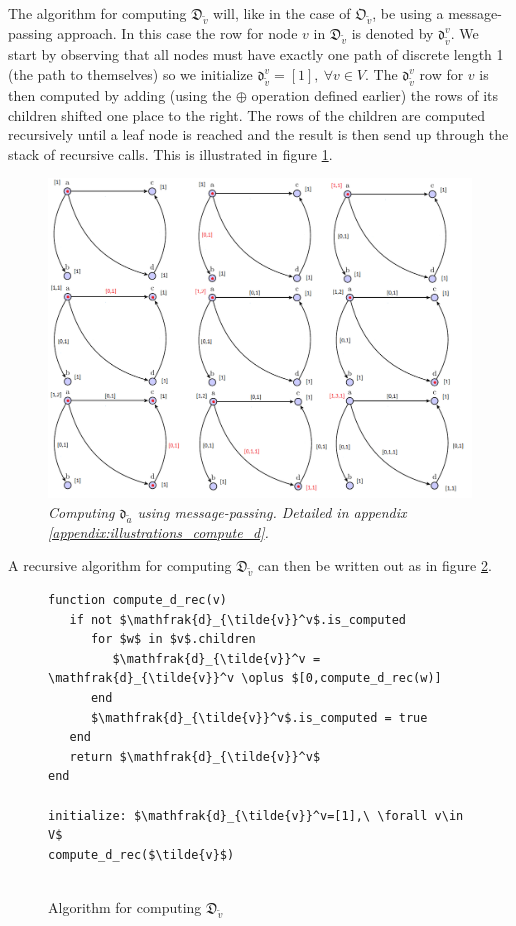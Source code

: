 \documentclass{article}
\begin{document}
The algorithm for computing $\mathfrak{D}_{\tilde{v}}$ will, like in the case of $\mathfrak{O}_{\tilde{v}}$, be using a message-passing approach. In this case the row for node $v$ in $\mathfrak{D}_{\tilde{v}}$ is denoted by $\mathfrak{d}_{\tilde{v}}^v$. We start by observing that all nodes must have exactly one path of discrete length 1 (the path to themselves) so we initialize $\mathfrak{d}_{\tilde{v}}^v=[1],\ \forall v\in V$. The $\mathfrak{d}_{\tilde{v}}^v$ row for $v$ is then computed by adding (using the $\oplus$ operation defined earlier) the rows of its children shifted one place to the right. The rows of the children are computed recursively until a leaf node is reached and the result is then send up through the stack of recursive calls. This is illustrated in figure \ref{fig:compute_d}.
\begin{figure}[H]
	\includegraphics[width=12cm]{compute_d}
	\caption{\textit{Computing $\mathfrak{d}_{\tilde{a}}$ using message-passing.  Detailed in appendix \ref{appendix:illustrations_compute_d}.}}
	\label{fig:compute_d}
\end{figure}

A recursive algorithm for computing $\mathfrak{D}_{\tilde{v}}$ can then be written out as in figure \ref{algorithm:d}.

\begin{figure}[H]
\begin{lstlisting}
function compute_d_rec(v)
   if not $\mathfrak{d}_{\tilde{v}}^v$.is_computed
      for $w$ in $v$.children
         $\mathfrak{d}_{\tilde{v}}^v = \mathfrak{d}_{\tilde{v}}^v \oplus $[0,compute_d_rec(w)]
      end
      $\mathfrak{d}_{\tilde{v}}^v$.is_computed = true
   end
   return $\mathfrak{d}_{\tilde{v}}^v$
end
	
initialize: $\mathfrak{d}_{\tilde{v}}^v=[1],\ \forall v\in V$
compute_d_rec($\tilde{v}$)
	
\end{lstlisting}
	\caption{Algorithm for computing $\mathfrak{D}_{\tilde{v}}$}
	\label{algorithm:d}
\end{figure}
\end{document}
